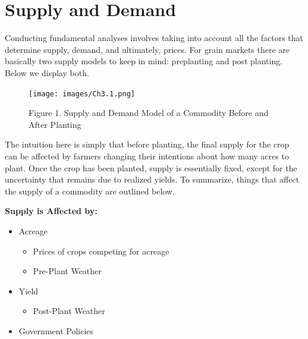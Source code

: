 \documentclass[
  letterpaper,
  DIV=11,
  numbers=noendperiod]{scrreprt}
\providecommand{\tightlist}{%
  \setlength{\itemsep}{0pt}\setlength{\parskip}{0pt}}\usepackage{longtable,booktabs,array}
\begin{document}
\hypertarget{supply-and-demand}{%
\section{Supply and Demand}\label{supply-and-demand}}

Conducting fundamental analyses involves taking into account all the
factors that determine supply, demand, and ultimately, prices. For grain
markets there are basically two supply models to keep in mind:
preplanting and post planting. Below we display both.

\begin{figure}

{\centering \texttt{[image: images/Ch3.1.png]}

}

\caption{Figure 1. Supply and Demand Model of a Commodity Before and
After Planting}

\end{figure}

The intuition here is simply that before planting, the final supply for
the crop can be affected by farmers changing their intentions about how
many acres to plant. Once the crop has been planted, supply is
essentially fixed, except for the uncertainty that remains due to
realized yields. To summarize, things that affect the supply of a
commodity are outlined below.

\textbf{Supply is Affected by:}

\begin{itemize}
\item
  Acreage

  \begin{itemize}
  \tightlist
  \item
    Prices of crops competing for acreage
  \item
    Pre-Plant Weather
  \end{itemize}
\item
  Yield

  \begin{itemize}
  \tightlist
  \item
    Post-Plant Weather
  \end{itemize}
\item
  Government Policies
\end{itemize}
\end{document}
